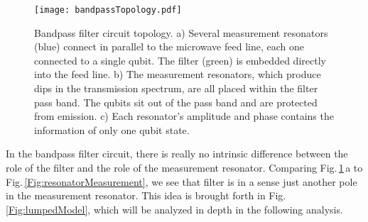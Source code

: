 \begin{figure}
\begin{centering}
\texttt{[image: bandpassTopology.pdf]}
\par\end{centering}
\caption{Bandpass filter circuit topology. a) Several measurement resonators (blue) connect in parallel to the microwave feed line, each one connected to a single qubit. The filter (green) is embedded directly into the feed line. b) The measurement resonators, which produce dips in the transmission spectrum, are all placed within the filter pass band. The qubits sit out of the pass band and are protected from emission. c) Each resonator's amplitude and phase contains the information of only one qubit state.}
\label{Fig:ch:bandpassFilter:sec:rationale:bandpassTopology}
\end{figure}

In the bandpass filter circuit, there is really no intrinsic difference between the role of the filter and the role of the measurement resonator.
Comparing Fig.\,\ref{Fig:ch:bandpassFilter:sec:rationale:bandpassTopology}\,a to Fig.\,\ref{Fig:resonatorMeasurement}, we see that filter is in a sense just another pole in the measurement resonator.
This idea is brought forth in Fig.\,\ref{Fig:lumpedModel}, which will be analyzed in depth in the following analysis.
